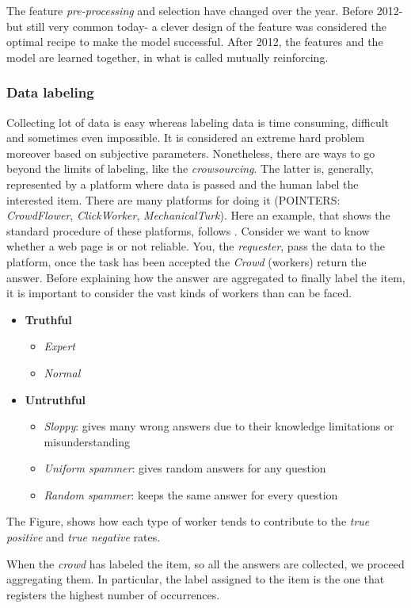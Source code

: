 The feature \emph{pre-processing} and selection have changed over the year. Before 2012- but still very common today- a clever design of the feature was considered the optimal recipe to make the model successful. After 2012, %
the features and the model are learned together, in what is called mutually reinforcing.

\subsubsection*{Data labeling}

Collecting lot of data is easy whereas labeling data is time consuming, difficult and sometimes even impossible. It is considered an extreme hard problem moreover based on subjective parameters. Nonetheless, there are ways to go beyond the limits of labeling, like the \emph{crowsourcing}. The latter is, generally, represented by a platform where data is passed and the human label the interested item. There are many platforms for doing it (POINTERS: \emph{CrowdFlower}, \emph{ClickWorker}, \emph{MechanicalTurk}).  Here an example, that shows the standard procedure of these platforms, follows . Consider we want to know whether a web page is or not reliable.  You, the \emph{requester}, pass the data to the platform, once the task has been accepted the \emph{Crowd} (workers) return the answer. Before explaining how the answer are aggregated to finally label the item, it is important to consider the vast kinds of workers than can be faced.
\begin{itemize}
\item \textbf{Truthful}
\begin{itemize}
\item \emph{Expert}
\item \emph{Normal}
\end{itemize}
\item \textbf{Untruthful}
\begin{itemize}
\item \emph{Sloppy}: gives many wrong answers due to their knowledge limitations or misunderstanding
\item \emph{Uniform spammer}: gives random answers for any question
\item \emph{Random spammer}: keeps the same answer for every question
\end{itemize}
\end{itemize}

The Figure, shows how each type of worker tends to contribute to the \emph{true positive} and \emph{true negative}  rates.

When the \emph{crowd} has labeled the item, so all the answers are collected, we proceed aggregating them. In particular, the label assigned to the item is the one that registers the highest number of occurrences.




 




